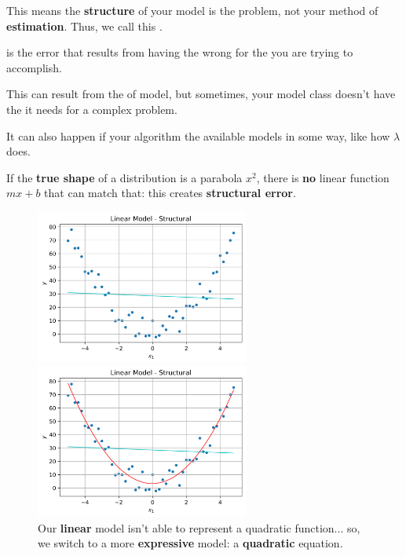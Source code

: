         This means the \textbf{structure} of your model is the problem, not your method of \textbf{estimation}. Thus, we call this .\\
        
        \begin{definition}
             is the error that results from having the wrong  for the  you are trying to accomplish.
            
            This can result from the  of model, but sometimes, your model class doesn't have the  it needs for a complex problem.
            
            It can also happen if your algorithm  the available models in some way, like how $\lambda$ does.
        \end{definition}
        
        \miniex If the \textbf{true shape} of a distribution is a parabola $x^2$, there is \textbf{no} linear function $mx+b$ that can match that: this creates \textbf{structural error}.
        
        \begin{figure}[H]
        
                \includegraphics[width=70mm,scale=0.5]{images/regression_images/Structural_Linear_Model.png}

                \includegraphics[width=70mm,scale=0.5]{images/regression_images/Structural_Quad_Model.png}

        
            \caption*{Our \textbf{linear} model isn't able to represent a quadratic function... so, we switch to a more \textbf{expressive} model: a \textbf{quadratic} equation.}
        \end{figure}
        
